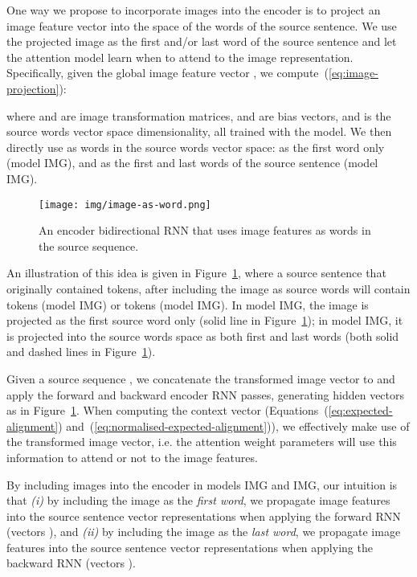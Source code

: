 \documentclass[11pt,twocolumn]{article}
\begin{document}
One way we propose to incorporate images into the encoder is to project an image feature vector into the space of the words of the source sentence.
We use the projected image as the first and/or last word of the source sentence and let the attention model learn when to attend to the image representation.
Specifically, given the global image feature vector ,
we compute~(\ref{eq:image-projection}):

\noindent
where  and  are image transformation matrices,  and  are bias vectors, and  is the source words vector space dimensionality, all trained with the model.
We then directly use  as words in the source words vector space:
as the first word only (model IMG), and
as the first and last words of the source sentence (model IMG).

\begin{figure}[t!]
 \centering
 \texttt{[image: img/image-as-word.png]}
 \caption{An encoder bidirectional RNN that uses image features
 as words in the source sequence.}
 \label{fig:image-as-word}
\end{figure}

An illustration of this idea is given in Figure~\ref{fig:image-as-word}, where a source sentence that originally contained  tokens, after including the image as source words will contain
 tokens (model IMG) or
 tokens (model IMG).
In model IMG, the image is projected as the first source word only (solid line in Figure~\ref{fig:image-as-word});
 in model IMG, it is projected into the source words space as both first and last words (both solid and dashed lines in Figure~\ref{fig:image-as-word}).
 
Given a source sequence ,
we concatenate the transformed image vector  to  and apply the forward and backward encoder RNN passes, generating hidden vectors as in Figure~\ref{fig:image-as-word}.
When computing the context vector  (Equations~(\ref{eq:expected-alignment}) and~(\ref{eq:normalised-expected-alignment})), we effectively make use of the transformed image vector, i.e. the  attention weight parameters will use this information to attend or not to the image features.

By including images into the encoder in models
IMG and IMG, our intuition is that
\textit{(i)} by including the image as the \emph{first word}, we propagate image features into the source sentence vector representations when applying the forward RNN  (vectors ), and
\textit{(ii)} by including the image as the \emph{last word}, we propagate image features into the source sentence vector representations when applying the backward RNN  (vectors ).
\end{document}
